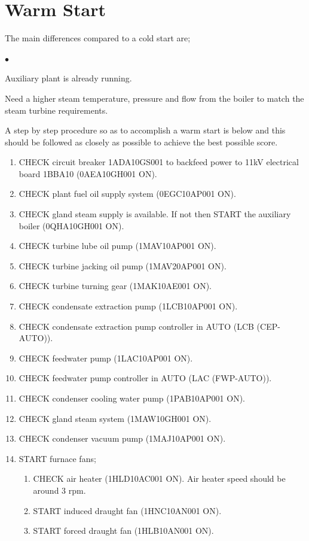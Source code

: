 \documentclass[10pt,a4paper]{article}
\begin{document}
\section*{Warm Start}
The main differences compared to a cold start are;
\begin{list}{$\bullet$}{}
\item Auxiliary plant is already running.
\item Need a higher steam temperature, pressure and flow from the boiler to match the steam turbine requirements.
\end{list}

A step by step procedure so as to accomplish a warm start is below and this should be followed as closely as possible to achieve the best possible score.
\begin{enumerate}
\item CHECK circuit breaker 1ADA10GS001 to backfeed power to 11kV electrical board 1BBA10 (0AEA10GH001 ON).
\item CHECK plant fuel oil supply system (0EGC10AP001 ON).
\item CHECK gland steam supply is available. If not then START the auxiliary boiler (0QHA10GH001 ON).
\item CHECK turbine lube oil pump (1MAV10AP001 ON).
\item CHECK turbine jacking oil pump (1MAV20AP001 ON).
\item CHECK turbine turning gear (1MAK10AE001 ON).
\item CHECK condensate extraction pump (1LCB10AP001 ON).
\item CHECK condensate extraction pump controller in AUTO (LCB (CEP-AUTO)). 
\item CHECK feedwater pump (1LAC10AP001 ON).
\item CHECK feedwater pump controller in AUTO (LAC (FWP-AUTO)). 
\item CHECK condenser cooling water pump (1PAB10AP001 ON).
\item CHECK gland steam system (1MAW10GH001 ON).
\item CHECK condenser vacuum pump (1MAJ10AP001 ON).
\item START furnace fans;
\begin{enumerate}
\item CHECK air heater (1HLD10AC001 ON). Air heater speed should be around 3 rpm.
\item START induced draught fan (1HNC10AN001 ON).
\item START forced draught fan (1HLB10AN001 ON).

\end{enumerate}
\end{enumerate}
\end{document}
